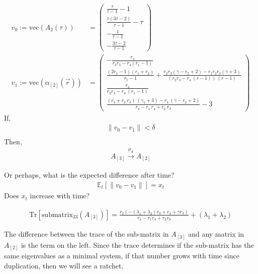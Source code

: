 \documentclass[11 pt]{article}
\newcommand{\1}{\mathbbm{1}}
\begin{document}
        \begin{align*}
            v_{0} := \text{vec}(A_{2}(\tau)) &= \left(\begin{array}{c} \frac{\tau}{\tau - 1} - 1\\ \frac{\tau \left(3 \tau - 2\right)}{\tau - 1} - \tau \\ - \frac{1}{\tau - 1} \\ -\frac{3 \tau - 2}{\tau - 1} \end{array}\right) \\
          v_{1} := \text{vec}(\alpha_{[2]}(\vec{r})) &= \left(\begin{array}{c} -\frac{r_{4}}{r_{2} r_{3} - r_{4} \left(r_{1} - 1\right)}\\ \frac{\left(2 r_{1} - 1\right) \left(r_{1} + r_{2}\right)}{r_{1} - 1} + \frac{r_{2} r_{3} \left(\gamma - r_{2} + 2\right) - r_{1} r_{2} r_{3} \left(\gamma + 3\right)}{\left(r_{2} r_{3} - r_{4}\ \left(r - 1\right)\right)\ \left(r - 1\right)}\\ \frac{r_{4}}{r_{2} r_{3} - r_{4}\ \left(r_{1} - 1\right)}\\ \frac{\left(r_{4} + r_{2}\ r_{3}\right)\ \left(\gamma_{1} + 3\right) - r_{4}\ \left(\gamma - r_{2} + 2\right)}{r_{4} - r_{1}\ r_{4} + r_{2}\ r_{3}} - 3 \end{array}\right) 
        \end{align*}
        If, 
        \begin{align*}
          \lVert v_{0} - v_{1} \rVert < \delta \\
        \end{align*}
        Then, 
        \begin{align*}
          A_{[3]} \xrightarrow{\mu_{d}} A_{[2]}
        \end{align*}

        Or perhaps, what is the expected difference after time?
        \begin{align*}
          \mathbb{E}_{t} \left[ \lVert v_{0} - v_{1} \rVert \right] = x_{t}
        \end{align*}
        Does $x_{t}$ increase with time?

        \begin{align*}
          \text{Tr} \left[ \text{submatrix}_{33} \left(A_{[3]}\right) \right] = \frac{r_{2} \left(-(\lambda_{1} + \lambda_{2}) r_{3} + r_{4} + \gamma r_{3}\right)}{r_{4} - r_{1}r_{4} + r_{2}r_{3}} + (\lambda_{1} + \lambda_{2})
        \end{align*}

        The difference between the trace of the sub-matrix in $A_{[3]}$ and any matrix in $A_{[2]}$ is the term on the left. Since the trace determines if the sub-matrix has the same eigenvalues as a minimal system, if that number grows with time since duplication, then we will see a ratchet. 


\end{document}
